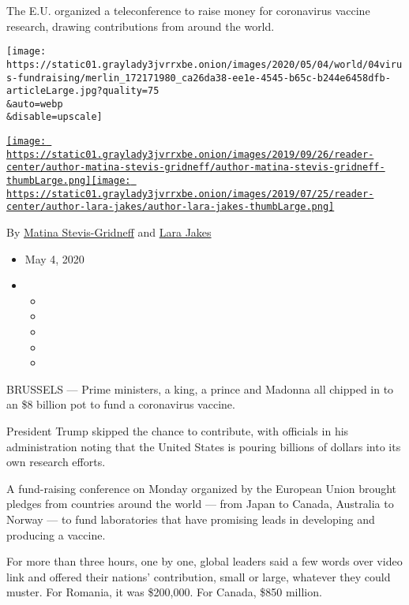 The E.U. organized a teleconference to raise money for coronavirus
vaccine research, drawing contributions from around the world.

\texttt{[image: https://static01.graylady3jvrrxbe.onion/images/2020/05/04/world/04virus-fundraising/merlin\_172171980\_ca26da38-ee1e-4545-b65c-b244e6458dfb-articleLarge.jpg?quality=75\\\&auto=webp\\\&disable=upscale]}

\href{https://www.nytimes3xbfgragh.onion/by/matina-stevis-gridneff}{\texttt{[image: https://static01.graylady3jvrrxbe.onion/images/2019/09/26/reader-center/author-matina-stevis-gridneff/author-matina-stevis-gridneff-thumbLarge.png]}}\href{https://www.nytimes3xbfgragh.onion/by/lara-jakes}{\texttt{[image: https://static01.graylady3jvrrxbe.onion/images/2019/07/25/reader-center/author-lara-jakes/author-lara-jakes-thumbLarge.png]}}

By
\href{https://www.nytimes3xbfgragh.onion/by/matina-stevis-gridneff}{Matina
Stevis-Gridneff} and
\href{https://www.nytimes3xbfgragh.onion/by/lara-jakes}{Lara Jakes}

\begin{itemize}
\item
  May 4, 2020
\item
  \begin{itemize}
  \item
  \item
  \item
  \item
  \item
  \end{itemize}
\end{itemize}

BRUSSELS --- Prime ministers, a king, a prince and Madonna all chipped
in to an \$8 billion pot to fund a coronavirus vaccine.

President Trump skipped the chance to contribute, with officials in his
administration noting that the United States is pouring billions of
dollars into its own research efforts.

A fund-raising conference on Monday organized by the European Union
brought pledges from countries around the world --- from Japan to
Canada, Australia to Norway --- to fund laboratories that have promising
leads in developing and producing a vaccine.

For more than three hours, one by one, global leaders said a few words
over video link and offered their nations' contribution, small or large,
whatever they could muster. For Romania, it was \$200,000. For Canada,
\$850 million.

